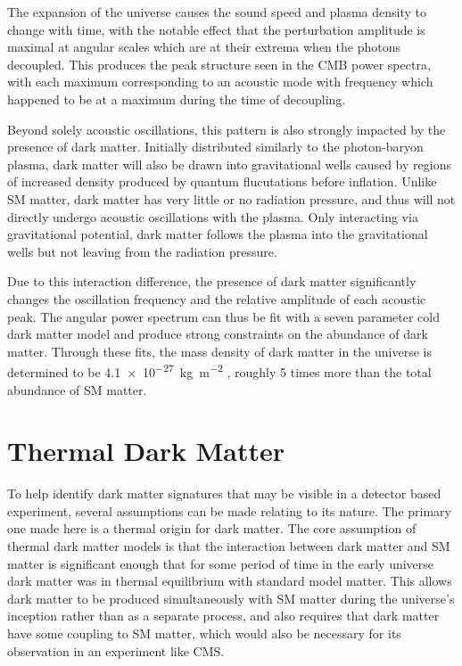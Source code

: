The expansion of the universe causes the sound speed and plasma density to change with time, with the notable effect that the perturbation amplitude is maximal at angular scales which are at their extrema when the photons decoupled. 
This produces the peak structure seen in the CMB power spectra, with each maximum corresponding to an acoustic mode with frequency which happened to be at a maximum during the time of decoupling.

Beyond solely acoustic oscillations, this pattern is also strongly impacted by the presence of dark matter.
Initially distributed similarly to the photon-baryon plasma, dark matter will also be drawn into gravitational wells caused by regions of increased density produced by quantum flucutations before inflation.
Unlike SM matter, dark matter has very little or no radiation pressure, and thus will not directly undergo acoustic oscillations with the plasma. 
Only interacting via gravitational potential, dark matter follows the plasma into the gravitational wells but not leaving from the radiation pressure. 

Due to this interaction difference, the presence of dark matter significantly changes the oscillation frequency and the relative amplitude of each acoustic peak.
The angular power spectrum can thus be fit with a seven parameter cold dark matter model and produce strong constraints on the abundance of dark matter.
Through these fits, the mass density of dark matter in the universe is determined to be \SI{4.1e-27}{\kilo\gram\per\meter\squared} \cite{PlanckCMB}, roughly 5 times more than the total abundance of SM matter.



\section{Thermal Dark Matter}
To help identify dark matter signatures that may be visible in a detector based experiment, several assumptions can be made relating to its nature. 
The primary one made here is a thermal origin for dark matter.
The core assumption of thermal dark matter models is that the interaction between dark matter and SM matter is significant enough that for some period of time in the early universe dark matter was in thermal equilibrium with standard model matter.
This allows dark matter to be produced simultaneously with SM matter during the universe's inception rather than as a separate process, and also requires that dark matter have some coupling to SM matter, which would also be necessary for its observation in an experiment like CMS.


